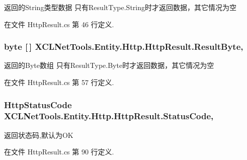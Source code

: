 返回的\-String类型数据 只有\-Result\-Type.\-String时才返回数据，其它情况为空 



在文件 Http\-Result.\-cs 第 46 行定义.

\hypertarget{class_x_c_l_net_tools_1_1_entity_1_1_http_1_1_http_result_aced655e4fc880e3123a3eb5c899a0085}{
\subsubsection[{Result\-Byte}]{\setlength{\rightskip}{0pt plus 5cm}byte \mbox{[}$\,$\mbox{]} X\-C\-L\-Net\-Tools.\-Entity.\-Http.\-Http\-Result.\-Result\-Byte\hspace{0.3cm}{\ttfamily [get]}, {\ttfamily [set]}}}\label{class_x_c_l_net_tools_1_1_entity_1_1_http_1_1_http_result_aced655e4fc880e3123a3eb5c899a0085}


返回的\-Byte数组 只有\-Result\-Type.\-Byte时才返回数据，其它情况为空 



在文件 Http\-Result.\-cs 第 57 行定义.

\hypertarget{class_x_c_l_net_tools_1_1_entity_1_1_http_1_1_http_result_afa7d6f65074d0dc74bca65f6e7d79a79}{
\subsubsection[{Status\-Code}]{\setlength{\rightskip}{0pt plus 5cm}Http\-Status\-Code X\-C\-L\-Net\-Tools.\-Entity.\-Http.\-Http\-Result.\-Status\-Code\hspace{0.3cm}{\ttfamily [get]}, {\ttfamily [set]}}}\label{class_x_c_l_net_tools_1_1_entity_1_1_http_1_1_http_result_afa7d6f65074d0dc74bca65f6e7d79a79}


返回状态码,默认为\-O\-K 



在文件 Http\-Result.\-cs 第 90 行定义.

